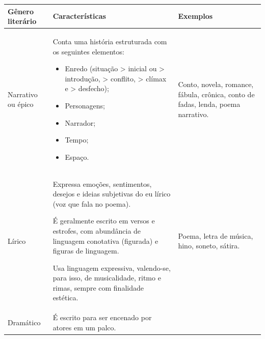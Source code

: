 \begin{longtable}[]{@{}lll@{}}
\toprule
\begin{minipage}[b]{0.29\columnwidth}\raggedright
\textbf{Gênero literário}\strut
\end{minipage} & \begin{minipage}[b]{0.29\columnwidth}\raggedright
\textbf{Características}\strut
\end{minipage} & \begin{minipage}[b]{0.29\columnwidth}\raggedright
\textbf{Exemplos}\strut
\end{minipage}\tabularnewline
\midrule
\endhead
\begin{minipage}[t]{0.29\columnwidth}\raggedright
Narrativo ou épico\strut
\end{minipage} & \begin{minipage}[t]{0.29\columnwidth}\raggedright
Conta uma história estruturada com os seguintes elementos:

\begin{itemize}
\item
  Enredo (situação \textgreater{} inicial ou \textgreater{} introdução,
  \textgreater{} conflito, \textgreater{} clímax e \textgreater{}
  desfecho);
\item
  Personagens;
\item
  Narrador;
\item
  Tempo;
\item
  Espaço.
\end{itemize}\strut
\end{minipage} & \begin{minipage}[t]{0.29\columnwidth}\raggedright
Conto, novela, romance, fábula, crônica, conto de fadas, lenda, poema
narrativo.\strut
\end{minipage}\tabularnewline
\begin{minipage}[t]{0.29\columnwidth}\raggedright
Lírico\strut
\end{minipage} & \begin{minipage}[t]{0.29\columnwidth}\raggedright
Expressa emoções, sentimentos, desejos e ideias subjetivas do eu lírico
(voz que fala no poema).

É geralmente escrito em versos e estrofes, com abundância de linguagem
conotativa (figurada) e figuras de linguagem.

Usa linguagem expressiva, valendo-se, para isso, de musicalidade, ritmo
e rimas, sempre com finalidade estética.\strut
\end{minipage} & \begin{minipage}[t]{0.29\columnwidth}\raggedright
Poema, letra de música, hino, soneto, sátira.\strut
\end{minipage}\tabularnewline
\begin{minipage}[t]{0.29\columnwidth}\raggedright
Dramático\strut
\end{minipage} & \begin{minipage}[t]{0.29\columnwidth}\raggedright
É escrito para ser encenado por atores em um palco.


\end{minipage}
\end{longtable}
